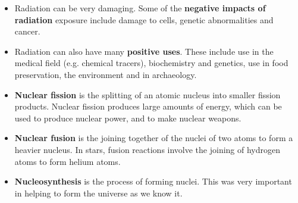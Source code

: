 \begin{itemize}
\item{Radiation can be very damaging. Some of the \textbf{negative impacts of radiation} exposure include damage to cells, genetic abnormalities and cancer.}
\item{Radiation can also have many \textbf{positive uses}. These include use in the medical field (e.g.\@{} chemical tracers), biochemistry and genetics, use in food preservation, the environment and in archaeology.}
\item{\textbf{Nuclear fission} is the splitting of an atomic nucleus into smaller fission products. Nuclear fission produces large amounts of energy, which can be used to produce nuclear power, and to make nuclear weapons.}
\item{\textbf{Nuclear fusion} is the joining together of the nuclei of two atoms to form a heavier nucleus. In stars, fusion reactions involve the joining of hydrogen atoms to form helium atoms.}
\item{\textbf{Nucleosynthesis} is the process of forming nuclei. This was very important in helping to form the universe as we know it.}
\end{itemize}


